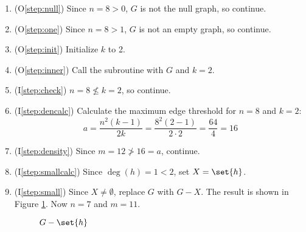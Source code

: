 \begin{enumerate}
\item (O\ref{step:null}) Since \(n=8>0\), \(G\) is not the null graph, so continue.

\item (O\ref{step:one}) Since \(n=8>1\), \(G\) is not an empty graph, so continue.

\item (O\ref{step:init}) Initialize \(k\) to 2.

\item (O\ref{step:inner}) Call the subroutine with \(G\) and \(k=2\).

\item (I\ref{step:check}) \(n=8\nleq k=2\), so continue.

\item (I\ref{step:dencalc}) Calculate the maximum edge threshold for \(n=8\) and \(k=2\):
  \[a=\frac{n^2(k-1)}{2k}=\frac{8^2(2-1)}{2\cdot2}=\frac{64}{4}=16\]

\item (I\ref{step:density}) Since \(m=12\ngtr16=a\), continue.

\item (I\ref{step:smallcalc}) Since \(\deg(h)=1<2\), set \(X=\set{h}\).

\item (I\ref{step:small}) Since \(X\ne\emptyset\), replace \(G\) with \(G-X\).  The result is shown in Figure
  \ref{fig:removeh}.  Now \(n=7\) and \(m=11\).

  \begin{figure}[h]
    \label{fig:removeh}
    \begin{center}
    \end{center}
    \caption{\(G-\set{h}\)}
  \end{figure}


\end{enumerate}

